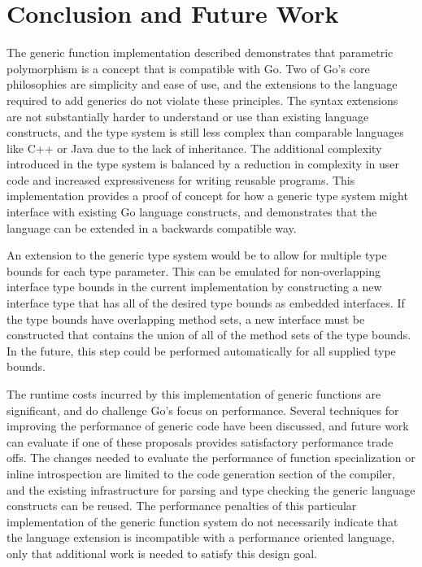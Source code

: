 \documentclass[letterpaper,twocolumn,11pt]{article}
\begin{document}
\section{Conclusion and Future Work} \label{conclusion}

The generic function implementation described demonstrates that parametric polymorphism is a concept that is compatible with Go. Two of Go's core philosophies are simplicity and ease of use, and the extensions to the language required to add generics do not violate these principles. The syntax extensions are not substantially harder to understand or use than existing language constructs, and the type system is still less complex than comparable languages like C++ or Java due to the lack of inheritance. The additional complexity introduced in the type system is balanced by a reduction in complexity in user code and increased expressiveness for writing reusable programs. This implementation provides a proof of concept for how a generic type system might interface with existing Go language constructs, and demonstrates that the language can be extended in a backwards compatible way.

An extension to the generic type system would be to allow for multiple type bounds for each type parameter. This can be emulated for non-overlapping interface type bounds in the current implementation by constructing a new interface type that has all of the desired type bounds as embedded interfaces. If the type bounds have overlapping method sets, a new interface must be constructed that contains the union of all of the method sets of the type bounds. In the future, this step could be performed automatically for all supplied type bounds. 

The runtime costs incurred by this implementation of generic functions are significant, and do challenge Go's focus on performance. Several techniques for improving the performance of generic code have been discussed, and future work can evaluate if one of these proposals provides satisfactory performance trade offs. The changes needed to evaluate the performance of function specialization or inline introspection are limited to the code generation section of the compiler, and the existing infrastructure for parsing and type checking the generic language constructs can be reused. The performance penalties of this particular implementation of the generic function system do not necessarily indicate that the language extension is incompatible with a performance oriented language, only that additional work is needed to satisfy this design goal.
\end{document}
